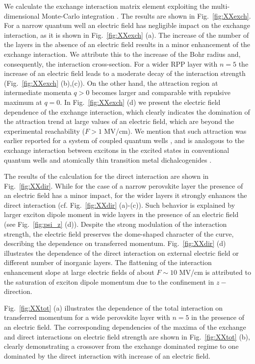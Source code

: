 \documentclass[prb,twocolumn,preprintnumbers,superscriptaddress]{revtex4}
\begin{document}
We calculate the exchange interaction matrix element exploiting  the  multi-dimensional  Monte-Carlo  integration  \cite{Hahn2005}.   
The results are shown in Fig.~\ref{fig:XXexch}. For a narrow quantum well an electric field has negligible impact on the exchange interaction, as it is shown in Fig.~\ref{fig:XXexch} (a). 
The increase of the number of the layers in the absence of an electric field results in a minor enhancement of the exchange interaction. We attribute this to the increase of the Bohr radius and, consequently, the interaction cross-section.
For a wider RPP layer with $n=5$  the increase of an electric field leads to a moderate decay of the interaction strength (Fig.~\ref{fig:XXexch} (b),(c)). On the other hand, the attraction region at intermediate momenta $q>0$ becomes larger and comparable with repulsive maximum at $q=0$.
In Fig.~\ref{fig:XXexch} (d) we present the electric field dependence of the exchange interaction, which clearly indicates the domination of the attraction trend at large values of an electric field, which are beyond the experimental reachability ($F> 1$ MV/cm).
We mention that such attraction was earlier reported for a system of coupled quantum wells \cite{Kyriienko2012}, and is analogous to the exchange interaction between excitons in the excited states in conventional quantum wells \cite{Shahnazaryan2016} and atomically thin transition metal dichalcogenides \cite{Shahnazaryan2017}.


The results of the calculation for the direct interaction are shown in Fig.~\ref{fig:XXdir}. 
While for the case of a narrow perovskite layer the presence of an electric field has a minor impact, for the wider layers it strongly enhances the direct interaction (cf. Fig.~\ref{fig:XXdir} (a)-(c)). 
Such behavior is explained by larger exciton dipole moment in wide layers in the presence of an electric field (see Fig.~\ref{fig:psi_z} (d)).
Despite the strong modulation of the interaction strength, the electric field preserves the dome-shaped character of the curve, describing the dependence on transferred  momentum. 
Fig.~\ref{fig:XXdir} (d) illustrates the  dependence of the direct interaction on external electric field or different number of inorganic layers. 
The flattening of the interaction enhancement slope at large electric fields of about $F \sim 10$ MV/cm is attributed to the saturation of  exciton dipole momentum due to the confinement in $z-$ direction.

Fig.~\ref{fig:XXtot} (a) illustrates the dependence of the total interaction on transferred momentum for a wide perovskite layer with $n=5$ in the presence of an electric field.
The corresponding dependencies of the maxima of the exchange and direct interactions on  electric field strength are shown in Fig.~\ref{fig:XXtot} (b),  clearly demonstrating a crossover from the exchange dominated regime to one dominated by the direct interaction with increase of an electric field. 
\end{document}

